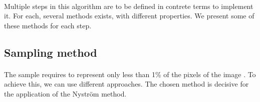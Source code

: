 \paragraph{}
Multiple steps in this algorithm are to be defined in contrete terms to implement it.
For each, several methods exists, with different properties.
We present some of these methods for each step.

\subsection{Sampling method}

\paragraph{}
The sample requires to represent only less than 1\% of the pixels of the image \cite{fowlkes_spectral_2004}.
To achieve this, we can use different approaches.
The chosen method is decisive for the application of the Nystr\"om method.
